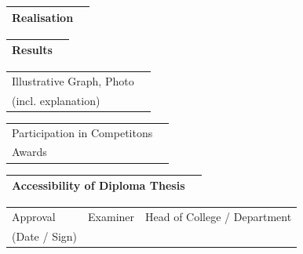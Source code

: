 \begin{tabular}{|p{\feldC}|p{\feldD}|}
 \hline
 Realisation & \\
 \hline
\end{tabular}

\begin{tabular}{|p{\feldC}|p{\feldD}|}
 \hline
 Results & \\
 \hline
\end{tabular}

\begin{tabular}{|p{\feldC}|p{\feldD}|}
 \hline
 Illustrative Graph, Photo & \\
 (incl. explanation) & \\
 \hline
\end{tabular}

\begin{tabular}{|p{\feldC}|p{\feldD}|}
 \hline
 Participation in Competitons & \\
 Awards & \\
 \hline
\end{tabular}

\begin{tabular}{|p{\feldC}|p{\feldD}|}
 \hline
 Accessibility of Diploma Thesis & \\
 \hline
\end{tabular}

\begin{tabular}{|p{\feldC}|p{\feldE}|p{\feldE}|}
 \hline
 Approval & \scriptsize{Examiner} & \scriptsize{Head of College / Department}\\ 
 (Date / Sign)& & \\
 \hline
\end{tabular}
\linespread{1.25} \normalsize

